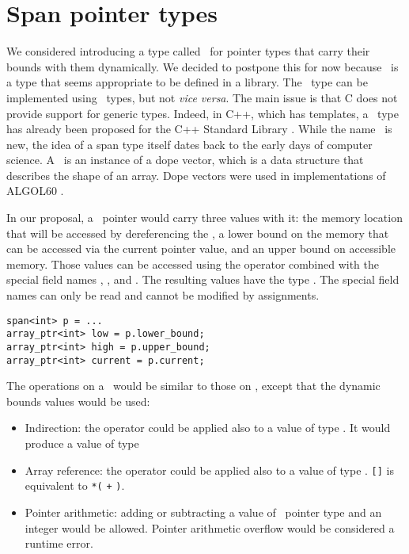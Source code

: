 \section{Span pointer types}
\label{section:span-design}

We considered introducing a type called \spanptr\ for pointer types that carry their bounds with
them dynamically.  We decided to postpone this for now because \spanptr\ is a type that
seems appropriate to be defined in a library. The \spanptr\ type can be implemented using
\arrayptr\ types, but not {\it vice versa}.   The main issue is that C does not provide support
for generic types.
Indeed, in C++, which has templates, a \spanptr\ type has already been proposed for the C++
Standard Library \cite{Macintosh2016}.
While the name \spanptr\ is new,
the idea of a span type itself dates back to the early days of computer science.
A \spanptr\ is an instance of a  dope vector, which is a data structure
that describes the shape of an array.  Dope vectors were used in
implementations of ALGOL60 \cite{Sattley1961}.

In our proposal, a \spanptrT\ pointer would carry three values with it: the memory location that
will be accessed by dereferencing the \spanptrT, a lower
bound on the memory that can be accessed via the current pointer value,
and an upper bound on accessible memory. Those values can be accessed
using the  operator combined with the special field names
, , and . The
resulting values have the type
\arrayptrT. The
special field names can only be read and cannot be modified by
assignments.

\begin{lstlisting}
span<int> p = ...
array_ptr<int> low = p.lower_bound;
array_ptr<int> high = p.upper_bound;
array_ptr<int> current = p.current;
\end{lstlisting}

The operations on a \spanptr\ would be similar to those on \arrayptr, except that
the dynamic bounds values would be used:
\begin{itemize}
\item  Indirection: the \code{*} operator could be applied also to a value of type \spanptrT.
It would produce a value of type 
\item
 Array reference: the \code{[]} operator could be applied also to a
  value of type \spanptrT.   \lstinline|[|\lstinline|]| is equivalent to
  \lstinline|*(| \lstinline|+| \lstinline|)|.
\item Pointer arithmetic: adding or subtracting a value of \spanptr\ pointer type and an integer
      would be allowed. Pointer arithmetic overflow would be considered a runtime error.
\end{itemize}

